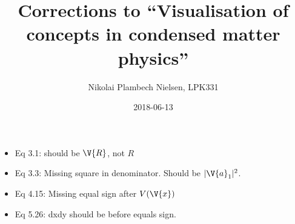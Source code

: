 \documentclass[a4paper,11pt]{article}
\title{Corrections to ``Visualisation of concepts in condensed matter physics''}
\author{Nikolai Plambech Nielsen, LPK331}
\date{2018-06-13}
\numberwithin{equation}{section}
\begin{document}
	\maketitle
	\begin{itemize}
		\item Eq 3.1: should be $ \V{R} $, not $ R $
		\item Eq 3.3: Missing square in denominator. Should be $ |\V{a}_1|^2 $.
		\item Eq 4.15: Missing equal sign after $ V(\V{x}) $
		\item Eq 5.26: dxdy should be before equals sign.
	\end{itemize}
	
\end{document}
